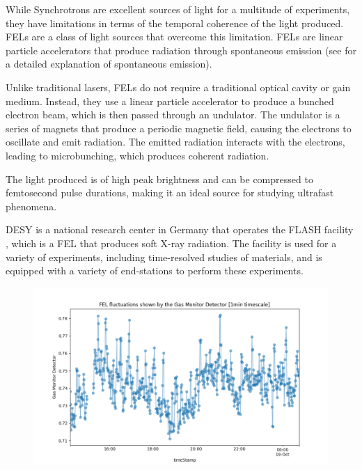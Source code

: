 While Synchrotrons are excellent sources of light for a multitude of experiments, they have limitations in terms of the temporal coherence of the light produced. \glspl{FEL} are a class of light sources that overcome this limitation. \glspl{FEL} are linear particle accelerators that produce radiation through spontaneous emission (see \cite[Chapters 5 and 10]{foxQuantumOpticsIntroduction2006} for a detailed explanation of spontaneous emission).

Unlike traditional lasers, FELs do not require a traditional optical cavity or gain medium. Instead, they use a linear particle accelerator to produce a bunched electron beam, which is then passed through an undulator. The undulator is a series of magnets that produce a periodic magnetic field, causing the electrons to oscillate and emit radiation. The emitted radiation interacts with the electrons, leading to microbunching, which produces coherent radiation.

The light produced is of high peak brightness and can be compressed to femtosecond pulse durations, making it an ideal source for studying ultrafast phenomena.

\gls{DESY} is a national research center in Germany that operates the \gls{FLASH} facility \cite{ackermannOperationFreeelectronLaser2007,tiedtkeSoftXrayFreeelectron2009}, which is a \gls{FEL} that produces soft X-ray radiation. The facility is used for a variety of experiments, including time-resolved studies of materials, and is equipped with a variety of end-stations to perform these experiments.


\begin{figure}
    \includegraphics[width=1\linewidth]{images/2024-08-16-13-56-32.png}
\end{figure}


